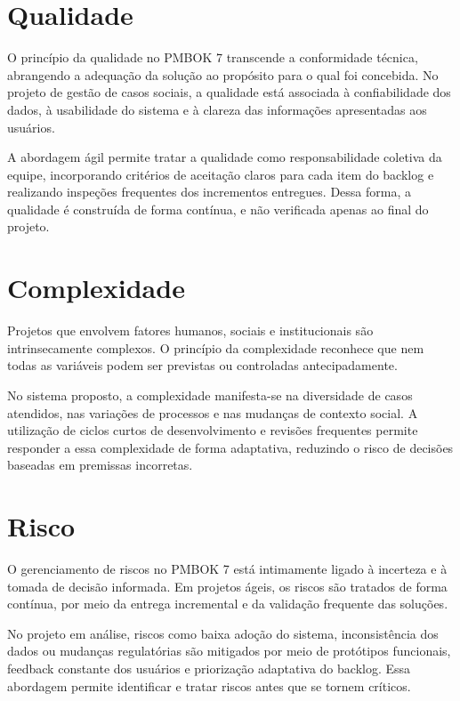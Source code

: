 \section{Qualidade}

O princípio da qualidade no PMBOK 7 transcende a conformidade técnica, abrangendo a adequação da solução ao propósito para o qual foi concebida. No projeto de gestão de casos sociais, a qualidade está associada à confiabilidade dos dados, à usabilidade do sistema e à clareza das informações apresentadas aos usuários.

A abordagem ágil permite tratar a qualidade como responsabilidade coletiva da equipe, incorporando critérios de aceitação claros para cada item do backlog e realizando inspeções frequentes dos incrementos entregues. Dessa forma, a qualidade é construída de forma contínua, e não verificada apenas ao final do projeto.

\section{Complexidade}

Projetos que envolvem fatores humanos, sociais e institucionais são intrinsecamente complexos. O princípio da complexidade reconhece que nem todas as variáveis podem ser previstas ou controladas antecipadamente.

No sistema proposto, a complexidade manifesta-se na diversidade de casos atendidos, nas variações de processos e nas mudanças de contexto social. A utilização de ciclos curtos de desenvolvimento e revisões frequentes permite responder a essa complexidade de forma adaptativa, reduzindo o risco de decisões baseadas em premissas incorretas.

\section{Risco}

O gerenciamento de riscos no PMBOK 7 está intimamente ligado à incerteza e à tomada de decisão informada. Em projetos ágeis, os riscos são tratados de forma contínua, por meio da entrega incremental e da validação frequente das soluções.

No projeto em análise, riscos como baixa adoção do sistema, inconsistência dos dados ou mudanças regulatórias são mitigados por meio de protótipos funcionais, feedback constante dos usuários e priorização adaptativa do backlog. Essa abordagem permite identificar e tratar riscos antes que se tornem críticos.

